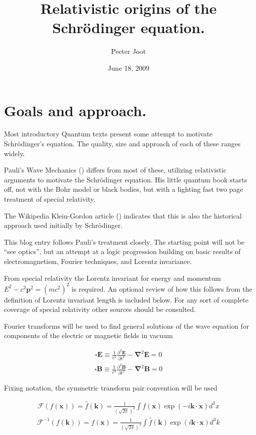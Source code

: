 \documentclass[]{eliblog}
\title{Relativistic origins of the Schr\"{o}dinger equation.}
\author{Peeter Joot}
\date{June 18, 2009}
\newcommand{\BB}[0]{\mathbf{B}}
\newcommand{\BE}[0]{\mathbf{E}}
\newcommand{\Bk}[0]{\mathbf{k}}
\newcommand{\Bp}[0]{\mathbf{p}}
\newcommand{\Bx}[0]{\mathbf{x}}
\newcommand{\spacegrad}[0]{\boldsymbol{\nabla}}
\newcommand{\delambertian}[0]{\square}
\newcommand{\inv}[1]{\frac{1}{#1}}
\newcommand{\FF}[0]{\mathcal{F}}
\begin{document}
\maketitle

\section{Goals and approach.}

Most introductory Quantum texts present some attempt to motivate Schr\"{o}dinger's equation.  The quality, size and approach of each of these ranges widely.
 
Pauli's Wave Mechanics (\cite{pauli2000wm}) differs from most of these, utilizing relativistic arguments to motivate the Schr\"{o}dinger equation.  His little quantum book starts off, not with the Bohr model or black bodies, but with a lighting fast two page treatment of special relativity.

The Wikipedia Klein-Gordon article (\cite{wikiKG}) indicates that this is also the historical approach used initially by Schr\"{o}dinger.

This blog entry follows Pauli's treatment closely.  The starting point will not be ``see optics'', but an attempt at a logic progression building on basic results of electromagnetism, Fourier techniques, and Lorentz invariance.

From special relativity the Lorentz invariant for energy and momentum $E^2 - c^2 \Bp^2 = (m c^2)^2$ is required.  An optional review of how this follows from the definition of Lorentz invariant length is included below.  For any sort
of complete coverage of special relativity other sources should be consulted.

Fourier transforms will be used to find general solutions of the wave equation for components of the electric or magnetic fields in vacuum

\begin{align}\label{eqn:waveE}
\delambertian \BE \equiv \inv{c^2} \frac{\partial^2 \BE}{\partial t^2} - \spacegrad^2 \BE = 0
\end{align}
\begin{align}\label{eqn:waveB}
\delambertian \BB \equiv \inv{c^2} \frac{\partial^2 \BB}{\partial t^2} - \spacegrad^2 \BB = 0
\end{align}

Fixing notation, the symmetric transform pair convention will be used

\begin{align}\label{eqn:Fourier}
\FF(f(\Bx)) = \hat{f}(\Bk) = \inv{(\sqrt{2\pi})^3} \int f(\Bx) \exp\left( -i \Bk \cdot \Bx \right) d^3 x 
\end{align}
\begin{align}\label{eqn:InvFourier}
\FF^{-1}({f}(\Bk)) = f(\Bx) = \inv{(\sqrt{2\pi})^3} \int \hat{f}(\Bk) \exp\left( i \Bk \cdot \Bx \right) d^3 k
\end{align}
\end{document}
